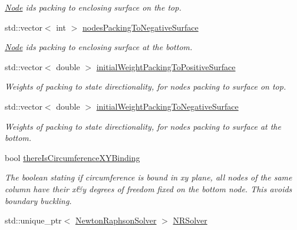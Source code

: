 \begin{DoxyCompactItemize}
\begin{DoxyCompactList}\small\item\em \hyperlink{classNode}{Node} ids packing to enclosing surface on the top. \end{DoxyCompactList}\item 
\hypertarget{classSimulation_a1d0748afb72db2f26f45d5186504a902}{}std\+::vector$<$ int $>$ \hyperlink{classSimulation_a1d0748afb72db2f26f45d5186504a902}{nodes\+Packing\+To\+Negative\+Surface}\label{classSimulation_a1d0748afb72db2f26f45d5186504a902}

\begin{DoxyCompactList}\small\item\em \hyperlink{classNode}{Node} ids packing to enclosing surface at the bottom. \end{DoxyCompactList}\item 
\hypertarget{classSimulation_adbfa67b9482e8aca3f0f09fa8be33b3c}{}std\+::vector$<$ double $>$ \hyperlink{classSimulation_adbfa67b9482e8aca3f0f09fa8be33b3c}{initial\+Weight\+Packing\+To\+Positive\+Surface}\label{classSimulation_adbfa67b9482e8aca3f0f09fa8be33b3c}

\begin{DoxyCompactList}\small\item\em Weights of packing to state directionality, for nodes packing to surface on top. \end{DoxyCompactList}\item 
\hypertarget{classSimulation_ac23138b2d969b8e89959ced5206f59fa}{}std\+::vector$<$ double $>$ \hyperlink{classSimulation_ac23138b2d969b8e89959ced5206f59fa}{initial\+Weight\+Packing\+To\+Negative\+Surface}\label{classSimulation_ac23138b2d969b8e89959ced5206f59fa}

\begin{DoxyCompactList}\small\item\em Weights of packing to state directionality, for nodes packing to surface at the bottom. \end{DoxyCompactList}\item 
\hypertarget{classSimulation_a38a26592cb20108652c8101026de864b}{}bool \hyperlink{classSimulation_a38a26592cb20108652c8101026de864b}{there\+Is\+Circumference\+X\+Y\+Binding}\label{classSimulation_a38a26592cb20108652c8101026de864b}

\begin{DoxyCompactList}\small\item\em The boolean stating if circumference is bound in xy plane, all nodes of the same column have their x\&y degrees of freedom fixed on the bottom node. This avoids boundary buckling. \end{DoxyCompactList}\item 
\hypertarget{classSimulation_ae799b43b58444df86277c65827076b61}{}std\+::unique\+\_\+ptr$<$ \hyperlink{classNewtonRaphsonSolver}{Newton\+Raphson\+Solver} $>$ \hyperlink{classSimulation_ae799b43b58444df86277c65827076b61}{N\+R\+Solver}\label{classSimulation_ae799b43b58444df86277c65827076b61}


\end{DoxyCompactItemize}
